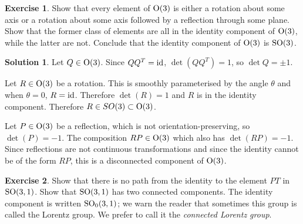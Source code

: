 \documentclass[11pt, a4paper]{report}
\theoremstyle{definition}
\newtheorem{exercise}{Exercise}[part]
\newtheorem{solution}{Solution}[part]
\newenvironment{ex}{\begin{exercise}}{\end{exercise}\pagebreak[1]}
\newenvironment{sol}{\begin{solution}}{\end{solution}\pagebreak[3]}
\renewcommand*{\O}{\ensuremath\text{O}}
\newcommand*{\SO}{\ensuremath\text{SO}}
\newcommand*{\op}[1]{\ensuremath\mathop{}\mathopen{}#1}
\newcommand*{\id}{\op{\mathrm{id}}}
\begin{document}
\begin{ex}

Show that every element of $\O(3)$ is either a rotation about some axis or a rotation about some axis followed by a reflection through some plane.
Show that the former class of elements are all in the identity component of $\O(3)$, while the latter are not.
Conclude that the identity component of $\O(3)$ is $\SO(3)$.

\end{ex}

\begin{sol}

Let $Q \in \O(3)$. Since $QQ^T = \id$, $\det(QQ^T) = 1$, so $\det{Q} = \pm 1$.

Let $R \in \O(3)$ be a rotation. This is smoothly parameterised by the angle $\theta$ and when $\theta = 0$, $R = \id$.
Therefore $\det(R) = 1$ and $R$ is in the identity component.
Therefore $R \in SO(3) \subset \O(3)$.

Let $P \in \O(3)$ be a reflection, which is not orientation-preserving, so $\det(P) = -1$.
The composition $RP \in \O(3)$ which also has $\det(RP) = -1$.
Since reflections are not continuous transformations and since the identity cannot be of the form $RP$, this is a disconnected component of $\O(3)$.

\end{sol}

\begin{ex}

Show that there is no path from the identity to the element $PT$ in $\SO(3, 1)$.
Show that $\SO(3, 1)$ has two connected components.
The identity component is written $\SO_0(3, 1)$;
we warn the reader that sometimes this group is called the Lorentz group.
We prefer to call it the \emph{connected Lorentz group}.

\end{ex}
\end{document}
